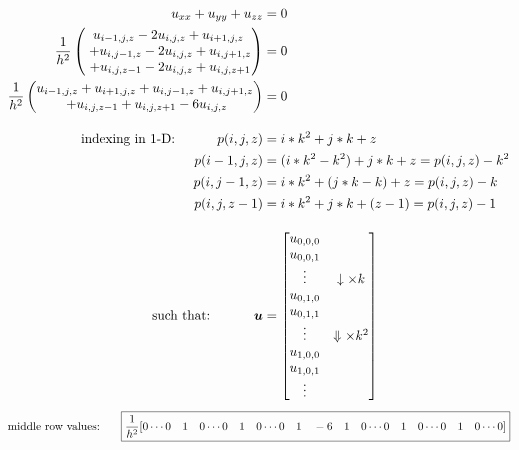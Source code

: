 \documentclass[12pt]{article}
\begin{document}
\begin{align*}
u_{xx} + u_{yy} + u_{zz} &= 0 \\
\frac{1}{h^2} \left(  \begin{matrix}
	u_{i-1,j,z} - 2u_{i,j,z} + u_{i+1,j,z} \\
	\; + u_{i,j-1,z} - 2u_{i,j,z} + u_{i,j+1,z} \\
	\; + u_{i,j,z-1} - 2u_{i,j,z} + u_{i,j,z+1}
\end{matrix} \right)  &= 0 \\
\frac{1}{h^2} \left( \begin{matrix}
	u_{i-1,j,z} + u_{i+1,j,z} + u_{i,j-1,z} + u_{i,j+1,z} \\
	\; + u_{i,j,z-1} + u_{i,j,z+1} - 6u_{i,j,z}
\end{matrix} \right) &= 0 \\[10pt]
\textnormal{indexing in 1-D: \hspace{10mm}} p(i,j,z) &= i*k^2 + j * k + z \\
	p(i-1,j,z) &= (i*k^2 - k^2) + j*k + z = p(i,j,z) - k^2 \\
	p(i,j-1,z) &= i*k^2 + (j*k - k) + z = p(i,j,z) - k \\
	p(i,j,z-1) &= i*k^2 + j*k + (z-1) = p(i,j,z) - 1 \\[10pt]
\textnormal{such that: \hspace{10mm}} \bm{u} &= \begin{bmatrix}
	u_{0,0,0} & \\ u_{0,0,1} & \\  \vdots & \downarrow \times k	\\
	u_{0,1,0} & \\ u_{0,1,1} & \\ \vdots & \Downarrow \times k^2 \\
	u_{1,0,0} & \\ u_{1,0,1} & \\ \vdots	\end{bmatrix} \\
\end{align*}
\[ \textnormal{middle row values: \hspace{5mm}} \boxed{ \frac{1}{h^2} 
	[0 \dotsm 0 \quad 1 \quad 0 \dotsm 0 \quad 1 \quad 0 \dotsm 0 \quad 1 \quad -6 \quad 1 \quad 0 \dotsm 0 \quad 1 \quad 0 \dotsm 0 \quad 1 \quad 0 \dotsm 0]  } \] \\
\end{document}
